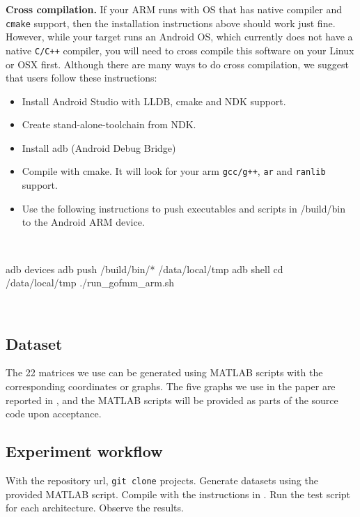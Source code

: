 \textbf{Cross compilation.}
If your ARM runs with OS that has native compiler and \texttt{cmake} support, 
then the installation instructions above should work just fine. However, while your
target runs an Android OS, which currently does not have a native
\texttt{C/C++} compiler, you will need to cross compile this software on your 
Linux or OSX first.
Although there are many ways to do cross compilation, we suggest that users
follow these instructions:
\begin{itemize}[leftmargin=*]\zapspace
  \item Install Android Studio with LLDB, cmake and NDK support.
  \item Create stand-alone-toolchain from NDK.
  \item Install adb (Android Debug Bridge)
  \item Compile with cmake. It will look for your arm \texttt{gcc/g++},
    \texttt{ar} and \texttt{ranlib} support.
  \item Use the following instructions to push executables and scripts in
    /build/bin to the Android ARM device.
\end{itemize}

\
\begin{verbnobox}[\small]
adb devices
adb push /build/bin/* /data/local/tmp
adb shell
cd /data/local/tmp
./run_gofmm_arm.sh
\end{verbnobox}
\

\subsection{Dataset}
The 22 matrices we use can be generated using MATLAB scripts with the 
corresponding coordinates or graphs. The five graphs we use in the paper
are reported in \secref{s:setup}, and the MATLAB scripts will be provided
as parts of the source code upon acceptance.

\subsection{Experiment workflow}
With the repository url, \texttt{git clone} projects.
Generate datasets using the provided MATLAB script.
Compile \gofmm{} with the instructions in .
Run the test script for each architecture. Observe the results.

